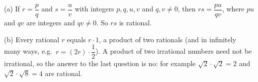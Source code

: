 (a) If $r=\dfrac{p}{q}$ and $s=\dfrac{u}{v}$ with integers $p,q,u,v$ and $q,v\ne0$, then $rs=\dfrac{pu}{qv}$, where $pu$ and $qv$ are integers and $qv\ne0$. So $rs$ is rational.

(b) Every rational $r$ equals $r\cdot1$, a product of two rationals (and in infinitely many ways, e.g.\ $r=(2r)\cdot\dfrac{1}{2}$). A product of two irrational numbers need not be irrational, so the answer to the last question is $\boxed{\text{no}}$: for example $\sqrt2\cdot\sqrt2=2$ and $\sqrt2\cdot\sqrt8=4$ are rational.

